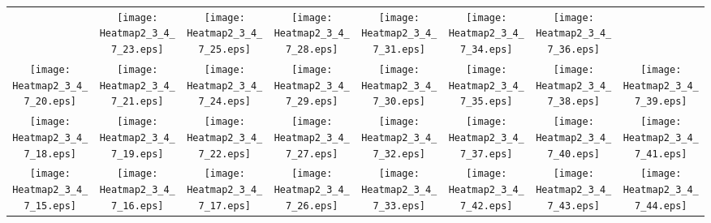 \documentclass{standalone}
\begin{document}
\renewcommand{\arraystretch}{0}
\setlength{\tabcolsep}{0pt}
\begin{tabular}{ *8{c} }
 & \texttt{[image: Heatmap2\_3\_4\_7\_23.eps]} & \texttt{[image: Heatmap2\_3\_4\_7\_25.eps]} & \texttt{[image: Heatmap2\_3\_4\_7\_28.eps]} & \texttt{[image: Heatmap2\_3\_4\_7\_31.eps]} & \texttt{[image: Heatmap2\_3\_4\_7\_34.eps]} & \texttt{[image: Heatmap2\_3\_4\_7\_36.eps]} &  \\
\texttt{[image: Heatmap2\_3\_4\_7\_20.eps]} & \texttt{[image: Heatmap2\_3\_4\_7\_21.eps]} & \texttt{[image: Heatmap2\_3\_4\_7\_24.eps]} & \texttt{[image: Heatmap2\_3\_4\_7\_29.eps]} & \texttt{[image: Heatmap2\_3\_4\_7\_30.eps]} & \texttt{[image: Heatmap2\_3\_4\_7\_35.eps]} & \texttt{[image: Heatmap2\_3\_4\_7\_38.eps]} & \texttt{[image: Heatmap2\_3\_4\_7\_39.eps]} \\
\texttt{[image: Heatmap2\_3\_4\_7\_18.eps]} & \texttt{[image: Heatmap2\_3\_4\_7\_19.eps]} & \texttt{[image: Heatmap2\_3\_4\_7\_22.eps]} & \texttt{[image: Heatmap2\_3\_4\_7\_27.eps]} & \texttt{[image: Heatmap2\_3\_4\_7\_32.eps]} & \texttt{[image: Heatmap2\_3\_4\_7\_37.eps]} & \texttt{[image: Heatmap2\_3\_4\_7\_40.eps]} & \texttt{[image: Heatmap2\_3\_4\_7\_41.eps]} \\
\texttt{[image: Heatmap2\_3\_4\_7\_15.eps]} & \texttt{[image: Heatmap2\_3\_4\_7\_16.eps]} & \texttt{[image: Heatmap2\_3\_4\_7\_17.eps]} & \texttt{[image: Heatmap2\_3\_4\_7\_26.eps]} & \texttt{[image: Heatmap2\_3\_4\_7\_33.eps]} & \texttt{[image: Heatmap2\_3\_4\_7\_42.eps]} & \texttt{[image: Heatmap2\_3\_4\_7\_43.eps]} & \texttt{[image: Heatmap2\_3\_4\_7\_44.eps]} \\

\end{tabular}
\end{document}

